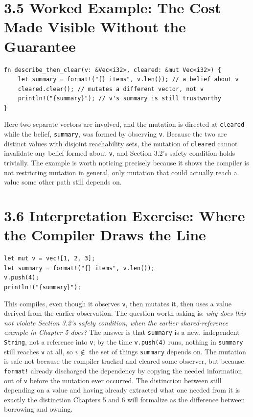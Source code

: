 \documentclass[11pt]{book}
\begin{document}
\section*{3.5 Worked Example: The Cost Made Visible Without the Guarantee}

\begin{lstlisting}
fn describe_then_clear(v: &Vec<i32>, cleared: &mut Vec<i32>) {
    let summary = format!("{} items", v.len()); // a belief about v
    cleared.clear(); // mutates a different vector, not v
    println!("{summary}"); // v's summary is still trustworthy
}
\end{lstlisting}

Here two separate vectors are involved, and the mutation is directed at \texttt{cleared} while the belief, \texttt{summary}, was formed by observing \texttt{v}. Because the two are distinct values with disjoint reachability sets, the mutation of \texttt{cleared} cannot invalidate any belief formed about \texttt{v}, and Section 3.2's safety condition holds trivially. The example is worth noticing precisely because it shows the compiler is not restricting mutation in general, only mutation that could actually reach a value some other path still depends on.

\section*{3.6 Interpretation Exercise: Where the Compiler Draws the Line}

\begin{lstlisting}
let mut v = vec![1, 2, 3];
let summary = format!("{} items", v.len());
v.push(4);
println!("{summary}");
\end{lstlisting}

This compiles, even though it observes \texttt{v}, then mutates it, then uses a value derived from the earlier observation. The question worth asking is: \emph{why does this not violate Section 3.2's safety condition, when the earlier shared-reference example in Chapter 5 does?} The answer is that \texttt{summary} is a new, independent \texttt{String}, not a reference into \texttt{v}; by the time \texttt{v.push(4)} runs, nothing in \texttt{summary} still reaches \texttt{v} at all, so $v \notin$ the set of things \texttt{summary} depends on. The mutation is safe not because the compiler tracked and cleared some observer, but because \texttt{format!} already discharged the dependency by copying the needed information out of \texttt{v} before the mutation ever occurred. The distinction between still depending on a value and having already extracted what one needed from it is exactly the distinction Chapters 5 and 6 will formalize as the difference between borrowing and owning.
\end{document}
